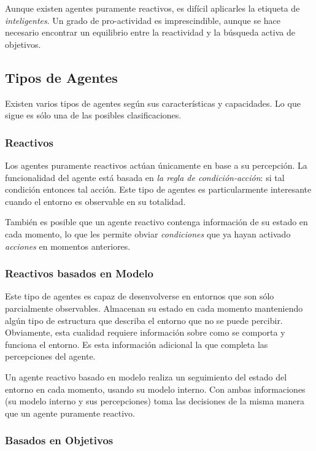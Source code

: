 Aunque existen agentes puramente reactivos, es difícil aplicarles la etiqueta
de {\em inteligentes}. Un grado de pro-actividad es imprescindible, aunque se
hace necesario encontrar un equilibrio entre la reactividad y la búsqueda
activa de objetivos.

\subsection*{Tipos de Agentes}


Existen varios tipos de agentes según sus características y capacidades. Lo que
sigue es sólo una de las posibles clasificaciones.

\subsubsection*{Reactivos}

Los agentes puramente reactivos actúan únicamente en base a su percepción. La
funcionalidad del agente está basada en {\em la regla de condición-acción}: si
tal condición entonces tal acción. Este tipo de agentes es particularmente
interesante cuando el entorno es observable en su totalidad.

También es posible que un agente reactivo contenga información de su estado en
cada momento, lo que les permite obviar {\em condiciones} que ya hayan activado
{\em acciones} en momentos anteriores.

\subsubsection*{Reactivos basados en Modelo}

Este tipo de agentes es capaz de desenvolverse en entornos que son sólo
parcialmente observables. Almacenan su estado en cada momento manteniendo algún
tipo de estructura que describa el entorno que no se puede percibir.
Obviamente, esta cualidad requiere información sobre como se comporta y
funciona el entorno. Es esta información adicional la que completa las
percepciones del agente.

Un agente reactivo basado en modelo realiza un seguimiento del estado del
entorno en cada momento, usando su modelo interno. Con ambas informaciones (su
modelo interno y sus percepciones) toma las decisiones de la misma manera que un
agente puramente reactivo.

\subsubsection*{Basados en Objetivos}

